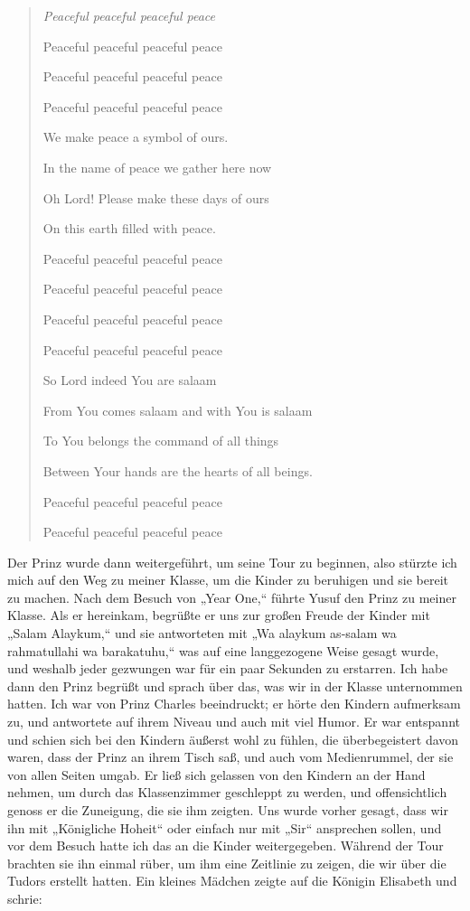 \documentclass[12pt]{memoir}
\begin{document}
\begin{quote}
\itshape
Peaceful peaceful peaceful peace

Peaceful peaceful peaceful peace

Peaceful peaceful peaceful peace

Peaceful peaceful peaceful peace

We make peace a symbol of ours.

In the name of peace we gather here now

Oh Lord! Please make these days of ours

On this earth filled with peace.

Peaceful peaceful peaceful peace

Peaceful peaceful peaceful peace

Peaceful peaceful peaceful peace

Peaceful peaceful peaceful peace

So Lord indeed You are salaam

From You comes salaam and with You is salaam

To You belongs the command of all things

Between Your hands are the hearts of all beings.

Peaceful peaceful peaceful peace

Peaceful peaceful peaceful peace
\end{quote}

Der Prinz wurde dann weitergeführt, um seine Tour zu beginnen,
also stürzte ich mich auf den Weg zu meiner Klasse,
um die Kinder zu beruhigen und sie bereit zu machen.
Nach dem Besuch von „Year One,“ führte Yusuf den Prinz zu meiner Klasse.
Als er hereinkam, begrüßte er uns zur großen Freude der Kinder
mit „Salam Alaykum,“ und sie antworteten mit
„Wa alaykum as-salam wa rahmatullahi wa barakatuhu,“
was auf eine langgezogene Weise gesagt wurde,
und weshalb jeder gezwungen war für ein paar Sekunden zu erstarren.
Ich habe dann den Prinz begrüßt und sprach über das,
was wir in der Klasse unternommen hatten.
Ich war von Prinz Charles beeindruckt; er hörte den Kindern aufmerksam zu,
und antwortete auf ihrem Niveau und auch mit viel Humor.
Er war entspannt und schien sich bei den Kindern äußerst wohl zu fühlen,
die überbegeistert davon waren, dass der Prinz an ihrem Tisch saß,
und auch vom Medienrummel, der sie von allen Seiten umgab.
Er ließ sich gelassen von den Kindern an der Hand nehmen,
um durch das Klassenzimmer geschleppt zu werden,
und offensichtlich genoss er die Zuneigung, die sie ihm zeigten.
Uns wurde vorher gesagt, dass wir ihn mit „Königliche Hoheit“
oder einfach nur mit „Sir“ ansprechen sollen,
und vor dem Besuch hatte ich das an die Kinder weitergegeben.
Während der Tour brachten sie ihn einmal rüber,
um ihm eine Zeitlinie zu zeigen, die wir über die Tudors erstellt hatten.
Ein kleines Mädchen zeigte auf die Königin Elisabeth und schrie:
\end{document}
